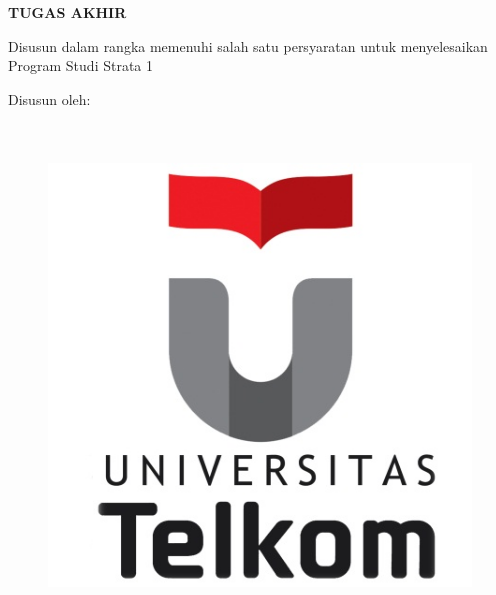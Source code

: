 
\begin{titlepage}
    \begin{center}      
        \bo{\Judul} \\[0.75cm]
        
        \textit{\bo{\JudulInggris}} \\[1.0cm]

        \vspace*{1 cm}    
        \textbf{TUGAS AKHIR}
        
        \vspace*{1 cm}
        
		Disusun dalam rangka memenuhi salah satu persyaratan untuk menyelesaikan\\
		Program Studi Strata 1 \program

        \vspace*{1 cm}       
        Disusun oleh:\\
        \bo{\Penulis} \\
        \bo{\nim} \\

        \vspace*{1.0cm}
        
        \begin{figure}
            \begin{center}
                \includegraphics[scale=1]{pics/Untel.jpg}
            \end{center}
        \end{figure}
        \vspace*{1.0cm}
    \end{center}
\end{titlepage}
